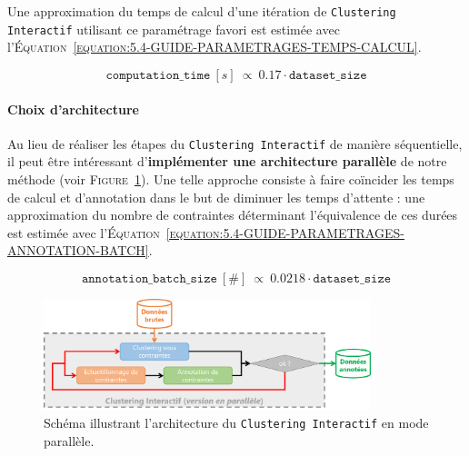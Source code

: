 			Une approximation du temps de calcul d'une itération de \texttt{Clustering Interactif} utilisant ce paramétrage favori est estimée avec l'\textsc{Équation~\ref{equation:5.4-GUIDE-PARAMETRAGES-TEMPS-CALCUL}}.
			
			\begin{equation}
				\label{equation:5.4-GUIDE-PARAMETRAGES-TEMPS-CALCUL}
				\texttt{computation\_time}~[s]~\propto~0.17 \cdot \texttt{dataset\_size}
			\end{equation}
		
		
		\paragraph{\textcolor{colorSilverLakeBlue}{\faCheckSquare} Choix d'architecture}
		
			Au lieu de réaliser les étapes du \texttt{Clustering Interactif} de manière séquentielle, il peut être intéressant d'\textbf{implémenter une architecture parallèle} de notre méthode (voir \textsc{Figure~\ref{figure:5.4-GUIDE-PARAMETRAGES-ARCHITECTURE-PARALLELE}}).
			Une telle approche consiste à faire coïncider les temps de calcul et d'annotation dans le but de diminuer les temps d'attente : une approximation du nombre de contraintes déterminant l'équivalence de ces durées est estimée avec l'\textsc{Équation~\ref{equation:5.4-GUIDE-PARAMETRAGES-ANNOTATION-BATCH}}.
			
			\begin{equation}
				\label{equation:5.4-GUIDE-PARAMETRAGES-ANNOTATION-BATCH}
				\texttt{annotation\_batch\_size}~[\#]~\propto~0.0218 \cdot \texttt{dataset\_size}
			\end{equation}
			
			\begin{figure}[H]
				\centering
				\includegraphics[width=0.85\textwidth]{figures/interactive-clustering-architecture-parallele}
				\caption{
					Schéma illustrant l'architecture du \texttt{Clustering Interactif} en mode parallèle.
				}
				\label{figure:5.4-GUIDE-PARAMETRAGES-ARCHITECTURE-PARALLELE}
			\end{figure}
	
